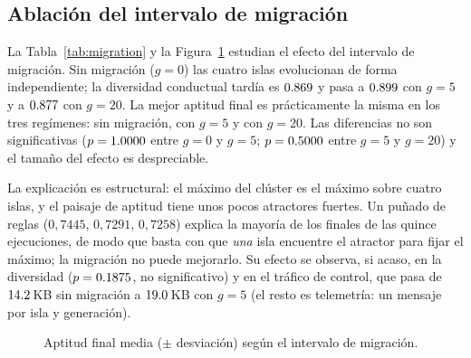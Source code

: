 \documentclass[11pt,a4paper]{article}
\begin{document}
\begin{table}[t]
\centering
\caption{Efecto del intervalo de migraci\'on $g$ en el cl\'uster de cuatro
islas ($0$ = sin migraci\'on).  Media $\pm$ desviaci\'on sobre cinco semillas;
la diversidad es la media de las \'ultimas $16$ generaciones.}
\label{tab:migration}

\end{table}

\subsection{Ablaci\'on del intervalo de migraci\'on}

La Tabla~\ref{tab:migration} y la Figura~\ref{fig:migration} estudian el efecto
del intervalo de migraci\'on.  Sin migraci\'on ($g=0$) las cuatro islas
evolucionan de forma independiente; la diversidad conductual tard\'ia es
$0.869$ y pasa a $0.899$ con $g=5$ y a $0.877$ con $g=20$.  La
mejor aptitud final es pr\'acticamente la misma en los tres reg\'imenes:
\MigNoneBest{} sin migraci\'on, \MigFiveBest{} con $g=5$ y \MigTwentyBest{} con $g=20$.
Las diferencias no son significativas ($p=1.0000$ entre $g=0$ y $g=5$;
$p=0.5000$ entre $g=5$ y $g=20$) y el tama\~no del efecto es
despreciable.

La explicaci\'on es estructural: el m\'aximo del cl\'uster es el m\'aximo sobre
cuatro islas, y el paisaje de aptitud tiene unos pocos atractores fuertes.  Un
pu\~nado de reglas ($0{,}7445$, $0{,}7291$, $0{,}7258$) explica la mayor\'ia de
los finales de las quince ejecuciones, de modo que basta con que \emph{una} isla
encuentre el atractor para fijar el m\'aximo; la migraci\'on no puede mejorarlo.
Su efecto se observa, si acaso, en la diversidad ($p=0.1875$, no
significativo) y en el tr\'afico de control, que pasa de $14.2$\,KB sin
migraci\'on a $19.0$\,KB con $g=5$ (el resto es telemetr\'ia: un mensaje por
isla y generaci\'on).

\begin{figure}[t]
\centering
{}
\caption{Aptitud final media ($\pm$ desviaci\'on) seg\'un el intervalo de
migraci\'on.}
\label{fig:migration}
\end{figure}
\end{document}

